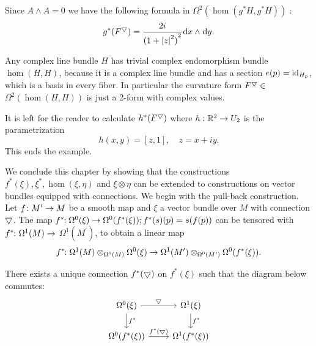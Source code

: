 \begin{example}
  Since $A \land  A = 0$ we have the following formula in $\Omega^{2}( {\hom( {{g}^{ * }H,{g}^{ * }H}) })$ :
  \begin{align}\label{eq:17-12}
    {g}^{ * }( {F}^\btd)  = \frac{2i}{{( 1 + {\left| z\right| }^{2}) }^{2}}{\!\dd x} \land  {\!\dd y}.
  \end{align}

  Any complex line bundle $H$ has trivial complex endomorphism bundle $\hom( {H,H})$, because it is a complex line 
  bundle and has a section $e(p)  = {\mathrm{id}}_{{H}_{p}}$, which is a basis in every fiber. In particular 
  the curvature form ${F}^\bigtriangledown \in$  $\Omega^{2}( {\hom( {H,H}) })$ is just a 2-form with complex values.

  It is left for the reader to calculate ${h}^{ * }( {F}^\bigtriangledown)$ where $h:{\mathbb{R}}^{2} \rightarrow  {U}_{2}$ is the 
  parametrization
  \[
    h( x, y)  = [{z,1}],\quad z = x + {iy}.
  \]
  This ends the example.
\end{example}

We conclude this chapter by showing that the constructions $f^*(\xi),\xi^*,\hom( \xi, \eta)$ 
and $\xi  \otimes  \eta$ can be extended to constructions on vector bundles equipped with connections. We 
begin with the pull-back construction. Let $f\!:{M}^{\prime } \rightarrow  M$ be a smooth map and $\xi$ a vector bundle 
over $M$ with connection $\bigtriangledown$. The map $f^*\!\!:\Omega^0(\xi)\rightarrow\Omega^0(f^*(\xi)); f^*(s) (p) = s( {f(p) })$ 
can be tensored with $f^*\!\colon\Omega^1(M)  \rightarrow$  $\Omega^1( {M}^{\prime })$, to obtain a linear map
\[
  f^*\!\!:\Omega^1(M) \otimes_{\Omega^0(M) }\Omega^0(\xi)  
  \rightarrow 
  \Omega^1( {M}^{\prime }) \otimes_{\Omega^0( {M}^{\prime }) }\Omega^0( {f^*(\xi) }).
\]

\begin{lemma}\label{lemma:17-10}
There exists a unique connection $f^*( \bigtriangledown )$ on $f^*(\xi)$ such that the diagram below commutes:
\[\begin{tikzcd}
  \Omega^0(\xi) \dar{f^*}\rar{\btd} & \Omega^1(\xi) \dar{f^*} \\
  \Omega^0( {f^*(\xi) }) \rar{f^*( \btd )} & \Omega^1( {f^*(\xi) })
\end{tikzcd}\]
\end{lemma}


